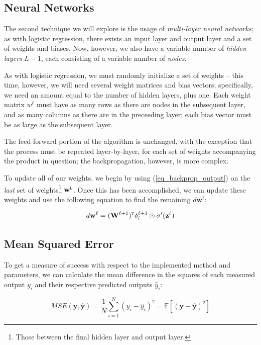 \documentclass[a4paper,10pt,english]{article}
\begin{document}
\begin{multicols*}{2}
\subsection*{Neural Networks}

The second technique we will explore is the usage of \textit{multi-layer neural networks}; as with logistic regression, there exists an input layer and output layer and a set of weights and biases.  Now, however, we also have a variable number of \textit{hidden layers} $L-1$, each consisting of a variable number of \textit{nodes}.

As with logistic regression, we must randomly initialize a set of weights – this time, however, we will need several weight matrices and bias vectors; specifically, we need an amount equal to the number of hidden layers, plus one.  Each weight matrix $w^\ell$ must have as many rows as there are nodes in the subsequent layer, and as many columns as there are in the preceeding layer; each bias vector must be as large as the subsequent layer.

The feed-forward portion of the algorithm is unchanged, with the exception that the process must be repeated layer-by-layer, for each set of weights accompanying the product in question; the backpropagation, however, is more complex.

To update all of our weights, we begin by using (\ref{eq_backprop_output}) on the \textit{last} set of weights\footnote{Those between the final hidden layer and output layer.} $\mathbf{w}^\textsc{l}$.  Once this has been accomplished, we can update these weights and use the following equation to find the remaining $d\mathbf{w}^\ell$:

\begin{equation*}
d\mathbf{w}^\ell = (\mathbf{W}^{\ell+1})^\textsc{t} \delta^{\ell+1}_i \odot \sigma^\prime(\mathbf{z}^\ell)
\end{equation*}

\subsection*{Mean Squared Error}

To get a measure of success with respect to the implemented method and parameters, we can calculate the mean difference in the squares of each measured output $y_i$ and their respective predicted outputs $\hat{y}_i$:

\begin{equation*}
MSE(\mathbf{y}, \mathbf{\hat{y}}) = \frac{1}{N} \sum_{i=1}^{N} (y_i - \hat{y}_i)^2 = \mathbb{E}\left[(\mathbf{y}-\hat{\mathbf{y}})^{2}\right]
\end{equation*}


\end{multicols*}
\end{document}
